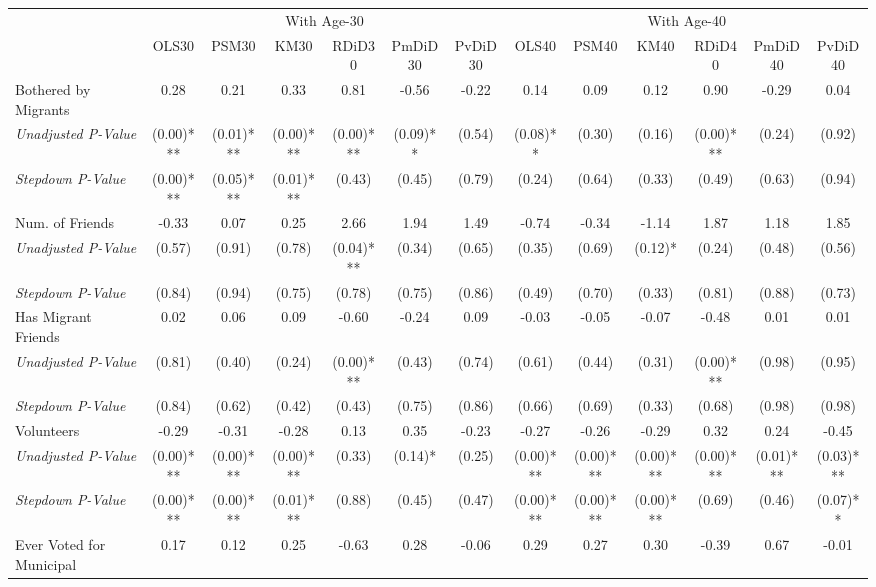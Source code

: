 \begin{tabular}{l c c c c c c c c c c c c}
\toprule
& \multicolumn{6}{c}{With Age-30} & \multicolumn{6}{c}{With Age-40} \\\cmidrule(lr){2-7} \cmidrule(lr){8-13}
 & OLS30 & PSM30 & KM30 & RDiD30 & PmDiD30 & PvDiD30 & OLS40 & PSM40 & KM40 & RDiD40 & PmDiD40 & PvDiD40 \\
\midrule
Bothered by Migrants & 0.28 & 0.21 & 0.33 & 0.81 & -0.56 & -0.22 & 0.14 & 0.09 & 0.12 & 0.90 & -0.29 & 0.04 \\
\quad \textit{Unadjusted P-Value} & (0.00)*** & (0.01)*** & (0.00)*** & (0.00)*** & (0.09)** & (0.54) & (0.08)** & (0.30) & (0.16) & (0.00)*** & (0.24) & (0.92) \\
\quad \textit{Stepdown P-Value} & (0.00)*** & (0.05)*** & (0.01)*** & (0.43) & (0.45) & (0.79) & (0.24) & (0.64) & (0.33) & (0.49) & (0.63) & (0.94) \\
Num. of Friends & -0.33 & 0.07 & 0.25 & 2.66 & 1.94 & 1.49 & -0.74 & -0.34 & -1.14 & 1.87 & 1.18 & 1.85 \\
\quad \textit{Unadjusted P-Value} & (0.57) & (0.91) & (0.78) & (0.04)*** & (0.34) & (0.65) & (0.35) & (0.69) & (0.12)* & (0.24) & (0.48) & (0.56) \\
\quad \textit{Stepdown P-Value} & (0.84) & (0.94) & (0.75) & (0.78) & (0.75) & (0.86) & (0.49) & (0.70) & (0.33) & (0.81) & (0.88) & (0.73) \\
Has Migrant Friends & 0.02 & 0.06 & 0.09 & -0.60 & -0.24 & 0.09 & -0.03 & -0.05 & -0.07 & -0.48 & 0.01 & 0.01 \\
\quad \textit{Unadjusted P-Value} & (0.81) & (0.40) & (0.24) & (0.00)*** & (0.43) & (0.74) & (0.61) & (0.44) & (0.31) & (0.00)*** & (0.98) & (0.95) \\
\quad \textit{Stepdown P-Value} & (0.84) & (0.62) & (0.42) & (0.43) & (0.75) & (0.86) & (0.66) & (0.69) & (0.33) & (0.68) & (0.98) & (0.98) \\
Volunteers & -0.29 & -0.31 & -0.28 & 0.13 & 0.35 & -0.23 & -0.27 & -0.26 & -0.29 & 0.32 & 0.24 & -0.45 \\
\quad \textit{Unadjusted P-Value} & (0.00)*** & (0.00)*** & (0.00)*** & (0.33) & (0.14)* & (0.25) & (0.00)*** & (0.00)*** & (0.00)*** & (0.00)*** & (0.01)*** & (0.03)*** \\
\quad \textit{Stepdown P-Value} & (0.00)*** & (0.00)*** & (0.01)*** & (0.88) & (0.45) & (0.47) & (0.00)*** & (0.00)*** & (0.00)*** & (0.69) & (0.46) & (0.07)** \\
Ever Voted for Municipal & 0.17 & 0.12 & 0.25 & -0.63 & 0.28 & -0.06 & 0.29 & 0.27 & 0.30 & -0.39 & 0.67 & -0.01 \\

\end{tabular}
